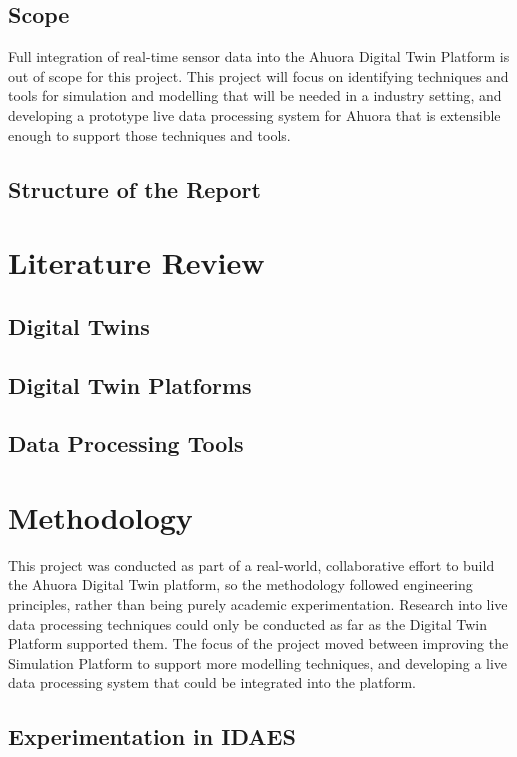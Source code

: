 \documentclass[12pt]{book}
\begin{document}
\section{Scope}

Full integration of real-time sensor data into the Ahuora Digital Twin Platform is out of scope for this project. 
This project will focus on identifying techniques and tools for simulation and modelling that will be needed in a industry setting,
and developing a prototype live data processing system for Ahuora that is extensible enough to support those techniques and tools.

\section{Structure of the Report}

\chapter{Literature Review}

\section{Digital Twins}

\section{Digital Twin Platforms}

\section{Data Processing Tools}

\chapter{Methodology}

This project was conducted as part of a real-world, collaborative effort to build the Ahuora Digital Twin platform, so the methodology followed engineering principles, rather than being purely academic experimentation. Research into live data processing techniques could only be conducted as far as the Digital Twin Platform supported them. The focus of the project moved between improving the Simulation Platform to support more modelling techniques, and developing a live data processing system that could be integrated into the platform.

\section{Experimentation in IDAES}
\end{document}
